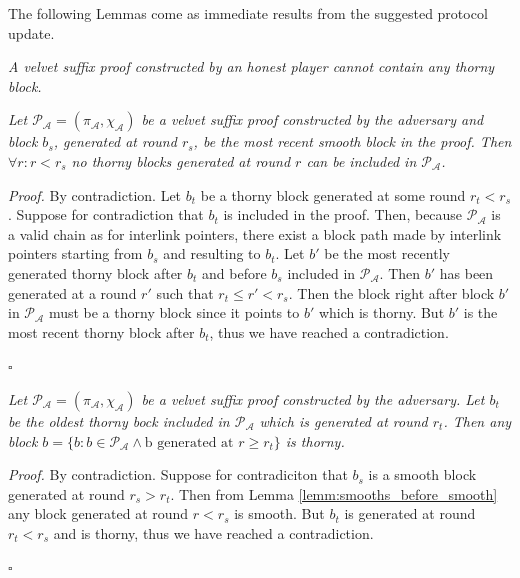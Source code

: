 The following Lemmas come as immediate results from the suggested protocol
update.\\

\begin{lemma}
	\textit{A velvet suffix proof constructed by an honest player cannot contain
	any thorny block.}
	\label{lemm:smooth_honest_suffix}
\end{lemma}

\begin{lemma} 
	\textit{Let $\mathcal{P_A} = (\pi_\mathcal{A}, \chi_\mathcal{A})$
	be a velvet suffix proof constructed by the adversary and block $b_s$, generated
	at round $r_s$, be the most recent smooth block in the proof. Then $\forall r:r < r_s$ no thorny blocks generated at round $r$ can be included in $\mathcal{P_A}$.}
	\label{lemm:smooths_before_smooth}
\end{lemma}
\textit{Proof.} By contradiction. Let $b_t$ be a thorny block generated at
some round $r_t < r_s$. Suppose for contradiction that $b_t$ is included in
the proof. Then, because $\mathcal{P_A}$ is a valid chain as for interlink
pointers, there exist a block path made by interlink pointers starting from $b_s$
and resulting to $b_t$. Let $b'$ be the most recently generated thorny block
after $b_t$ and before $b_s$ included in $\mathcal{P_A}$. 
Then $b'$ has been generated at a round $r'$ such that $r_t \leq r' < r_s$. Then
the block right after block $b'$ in $\mathcal{P_A}$ must be a thorny block since
it points to $b'$ which is thorny. But $b'$ is the most recent thorny block after
$b_t$, thus we have reached a contradiction.
\begin{flushright}
$\square$
\end{flushright}

\begin{lemma}
	\textit{Let $\mathcal{P_A} = (\pi_\mathcal{A}, \chi_\mathcal{A})$
	be a velvet suffix proof constructed by the adversary. Let $b_t$ be the oldest
	thorny bock included in $\mathcal{P_A}$ which is generated at round $r_t$. Then any block $b = \{b: b \in \mathcal{P_A} \wedge \text{b generated at }r \geq r_t \}$ is thorny.}
	\label{lemm:thorny_after_thorny}
\end{lemma}
\textit{Proof.} By contradiction. Suppose for contradiciton that $b_s$ is a smooth block generated at round $r_s > r_t$. Then from Lemma 
\ref{lemm:smooths_before_smooth} any block generated at round $r < r_s$ is smooth. But $b_t$ is generated at round $r_t < r_s$ and is thorny, thus we have reached a contradiction.
\begin{flushright}
$\square$
\end{flushright}

